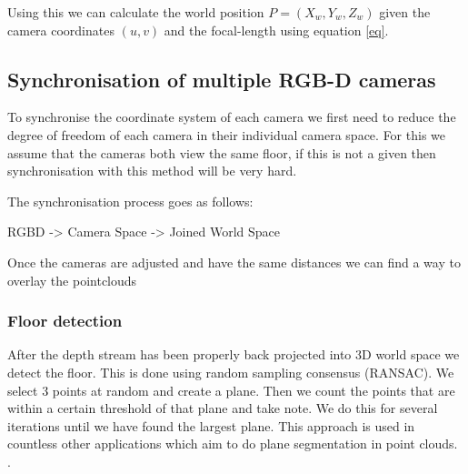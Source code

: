 Using this we can calculate the world position $P = (X_w, Y_w, Z_w)$ given the camera coordinates $(u, v)$ and the focal-length using equation \ref{eq}.


\subsection{Synchronisation of multiple RGB-D cameras}

To synchronise the coordinate system of each camera we first need to reduce the degree of freedom of each camera in their individual camera space. For this we assume that the cameras both view the same floor, if this is not a given then synchronisation with this method will be very hard.

The synchronisation process goes as follows:

RGBD -> Camera Space -> Joined World Space

Once the cameras are adjusted and have the same distances we can find a way to overlay the pointclouds

\subsubsection{Floor detection}

After the depth stream has been properly back projected into 3D world space we detect the floor. This is done using random sampling consensus (RANSAC). We select 3 points at random and create a plane. Then we count the points that are within a certain threshold of that plane and take note. We do this for several iterations until we have found the largest plane. This approach is used in countless other applications which aim to do plane segmentation in point clouds. \cite{floor-detection}.
